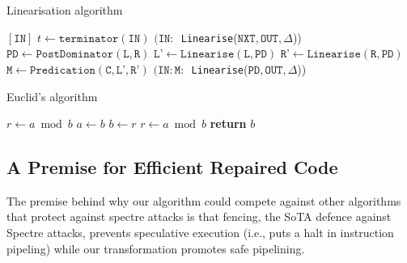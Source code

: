 \begin{algorithm}
    \caption{Linearisation algorithm}
    \label{Linearisation}
    \begin{algorithmic}[1] %
            	\State \Return $[\texttt{IN}]$
	   \Else
	   	\State $t \gets \texttt{terminator}(\texttt{IN})$
		      \State  \Return $(\texttt{IN}:$\texttt{ Linearise}({$\texttt{NXT},\texttt{OUT},\Delta$}))\ 
		  	\State $\texttt{PD} \gets \texttt{PostDominator}(\texttt{L},\texttt{R})$
			\State $\texttt{L'}\gets \texttt{Linearise}(\texttt{L},\texttt{PD})$
			\State $\texttt{R'}\gets \texttt{Linearise}(\texttt{R},\texttt{PD})$
			\State $\texttt{M} \gets \texttt{Predication}(\texttt{C},\texttt{L'},\texttt{R'})$
			 \State  \Return $(\texttt{IN}: \texttt{M}:$\texttt{ Linearise}({$\texttt{PD},\texttt{OUT},\Delta$}))\ 
		  \EndIf
            \EndIf
        \EndProcedure
    \end{algorithmic}
\end{algorithm}


\begin{algorithm}
    \caption{Euclid's algorithm}
    \label{euclid}
    \begin{algorithmic}[1] %
         
            \State $r\gets a \bmod b$
             
                \State $a \gets b$
                \State $b \gets r$
                \State $r \gets a \bmod b$
            \EndWhile\label{euclidendwhile}
            \State \textbf{return} $b$
        \EndProcedure
    \end{algorithmic}
\end{algorithm}

\subsection{A Premise for Efficient Repaired Code}
The premise behind why our algorithm could compete against other algorithms that protect against spectre attacks is that fencing, the SoTA defence against Spectre attacks, prevents speculative execution (i.e., puts a halt in instruction pipeling) while our transformation promotes safe pipelining.

